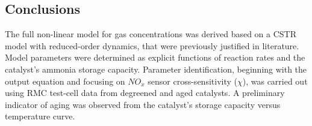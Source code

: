 \subsection{Conclusions}
The full non-linear model for gas concentrations was derived based on a CSTR
model with reduced-order dynamics, that were previously justified in
literature. Model parameters were determined as explicit functions of reaction
rates and the catalyst's ammonia storage capacity.  Parameter identification,
beginning with the output equation and focusing on $NO_x$ sensor
cross-sensitivity ($\chi$), was carried out using RMC test-cell data from
degreened and aged catalysts. A preliminary indicator of aging was observed
from the catalyst's storage capacity versus temperature curve.
